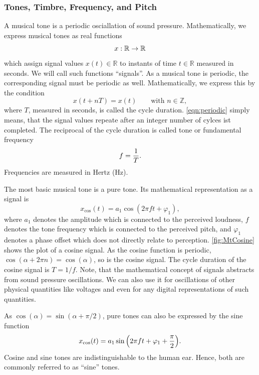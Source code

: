 \documentclass[a4paper]{article}
\begin{document}
\subsubsection{Tones, Timbre, Frequency, and Pitch}
\label{sssec:ttfp}
A musical tone is a periodic osciallation of sound pressure. Mathematically, we
express musical tones as real functions
\begin{equation}
  \notag
  x: \mathbb{R}\to \mathbb{R}
\end{equation}
which assign signal values $x(t)\in\mathbb{R}$ to instants of time
$t\in\mathbb{R}$ measured in seconds. We will call such functions ``signals''.
As a musical tone is periodic, the corresponding signal must be periodic as
well. Mathematically, we express this by the condition
\begin{equation}
  \label{eqn:periodic}
  x(t+nT) = x(t)
  \qquad\text{with }n\in\mathbb{Z},
\end{equation}
where $T$, measured in seconds, is called the cycle duration.
\cref{eqn:periodic} simply means, that the signal values repeate after an
integer number of cylces ist completed. The reciprocal of the cycle duration is
called tone or fundamental frequency
\begin{equation}
  \notag
  f = \frac{1}{T}.
\end{equation}
Frequencies are measured in Hertz (Hz).

The most basic musical tone is a pure tone. Its mathematical representation as a
signal is
\begin{equation}
  \label{eqn:MtCosine}
  x_{\cos}(t) = a_1\cos(2\pi f t+\varphi_1),
\end{equation}
where $a_1$ denotes the amplitude which is connected to the perceived loudness,
$f$ denotes the tone frequency which is connected to the perceived pitch, and
$\varphi_1$ denotes a phase offset which does not directly relate to
perception. \cref{fig:MtCosine} shows the plot of a cosine signal. As the cosine
function is periodic, $\cos(\alpha+2\pi n)=\cos(\alpha)$, so is the cosine
signal. The cycle duration of the cosine signal is $T=1/f$. Note, that the
mathematical concept of signals abstracts from sound pressure oscillations. We
can also use it for oscillations of other physical quantities like voltages and
even for any digital representations of such quantities.

As $\cos(\alpha) = \sin(\alpha+\pi/2)$, pure tones can also be expressed by the
sine function
\begin{equation}
  \notag
  x_{\cos}(t) = a_1\sin\left(2\pi f t+\varphi_1+\frac{\pi}{2}\right)\!.
\end{equation}
Cosine and sine tones are indistinguishable to the human ear. Hence, both are
commonly referred to as ``sine'' tones.
\end{document}
